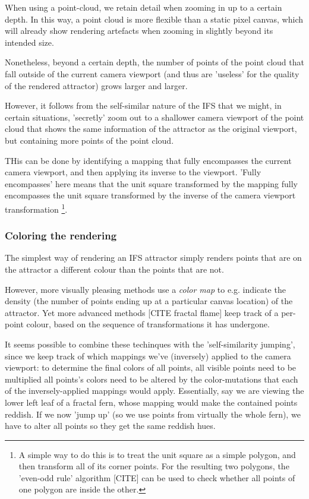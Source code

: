 \documentclass[11pt]{article}
\begin{document}
When using a point-cloud, we retain detail when zooming in up to a certain depth. In this way, a point cloud is more flexible than a 
static pixel canvas, which will already show rendering artefacts when zooming in slightly beyond its intended size.

Nonetheless, beyond a certain depth, the number of points of the point cloud that fall outside of the current camera viewport
(and thus are 'useless' for the quality of the rendered attractor) grows larger and larger.

However, it follows from the self-similar nature of the IFS that we might, in certain situations,
'secretly' zoom out to a shallower camera viewport of the point cloud that shows the same information of the attractor
as the original viewport, but containing more points of the point cloud.

THis can be done by identifying a mapping that fully encompasses the current camera viewport, and then applying its inverse
to the viewport.
'Fully encompasses' here means that the unit square transformed by the mapping fully encompasses
the unit square transformed by the inverse of the camera viewport transformation \footnote{A simple way to do this is to treat the unit square as a simple polygon,
and then transform all of its corner points. For the resulting two polygons, the 'even-odd rule' algorithm
[CITE]
can be used to check whether all points of one polygon are inside the other.}.


\subsubsection{Coloring the rendering}
\label{sec:orgb08e2cf}
\label{subsection:coloring}

The simplest way of rendering an IFS attractor simply renders points that are on the attractor a different colour
than the points that are not.

However, more visually pleasing methods use a \emph{color map} to e.g. indicate the density (the number of points ending up at a particular canvas location) of the attractor.
Yet more advanced methods [CITE fractal flame] keep track of a per-point colour, based on the sequence of transformations it has undergone.

It seems possible to combine these techinques with the 'self-similarity jumping', since we keep track of which mappings we've (inversely) applied to the camera viewport:
to determine the final colors of all points, all visible points need to be multiplied 
all points's colors need to be altered by the color-mutations that each of the inversely-applied mappings would apply.
Essentially, say we are viewing the lower left leaf of a fractal fern, whose mapping would make the contained points reddish. 
If we now 'jump up' (so we use points from virtually the whole fern), we have to alter all points so they get the same reddish hues.
\end{document}
